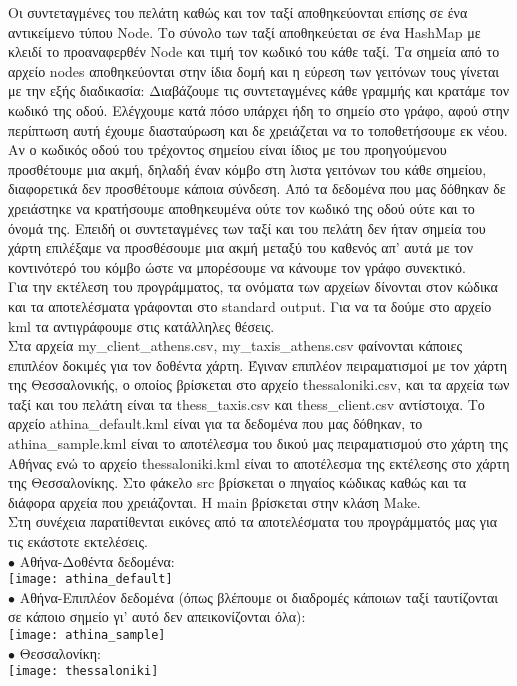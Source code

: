 \documentclass[12pt, a4 paper]{article}
\begin{document}
Οι συντεταγμένες του πελάτη καθώς και τον ταξί αποθηκεύονται επίσης σε ένα αντικείμενο τύπου \textlatin{Node}. Το σύνολο των ταξί αποθηκεύεται σε ένα \textlatin{HashMap} με κλειδί το προαναφερθέν \textlatin{Node} και τιμή τον κωδικό του κάθε ταξί. Τα σημεία από το αρχείο \textlatin{nodes} αποθηκεύονται στην ίδια δομή και η εύρεση των γειτόνων τους γίνεται με την εξής διαδικασία: Διαβάζουμε τις συντεταγμένες κάθε γραμμής και κρατάμε τον κωδικό της οδού. Ελέγχουμε κατά πόσο υπάρχει ήδη το σημείο στο γράφο, αφού στην περίπτωση αυτή έχουμε διασταύρωση και δε χρειάζεται να το τοποθετήσουμε εκ νέου. Αν ο κωδικός οδού του τρέχοντος σημείου είναι ίδιος με του προηγούμενου προσθέτουμε μια ακμή, δηλαδή έναν κόμβο στη λιστα γειτόνων του κάθε σημείου, διαφορετικά δεν προσθέτουμε κάποια σύνδεση. Από τα δεδομένα που μας δόθηκαν δε χρειάστηκε να κρατήσουμε αποθηκευμένα ούτε τον κωδικό της οδού ούτε και το όνομά της. Επειδή οι συντεταγμένες των ταξί και του πελάτη δεν ήταν σημεία του χάρτη επιλέξαμε να προσθέσουμε μια ακμή μεταξύ του καθενός απ' αυτά με τον κοντινότερό του κόμβο ώστε να μπορέσουμε να κάνουμε τον γράφο συνεκτικό.\\
Για την εκτέλεση του προγράμματος, τα ονόματα των αρχείων δίνονται στον κώδικα και τα αποτελέσματα γράφονται στο \textlatin{standard output}. Για να τα δούμε στο αρχείο \textlatin{kml} τα αντιγράφουμε στις κατάλληλες θέσεις.\\
Στα αρχεία \textlatin{my\_client\_athens.csv, my\_taxis\_athens.csv} φαίνονται κάποιες επιπλέον δοκιμές για τον δοθέντα χάρτη. Έγιναν επιπλέον πειραματισμοί με τον χάρτη της Θεσσαλονικής, ο οποίος βρίσκεται στο αρχείο \textlatin{thessaloniki.csv}, και τα αρχεία των ταξί και του πελάτη είναι τα \textlatin{thess\_taxis.csv} και \textlatin{thess\_client.csv} αντίστοιχα. Το αρχείο \textlatin{athina\_default.kml} είναι για τα δεδομένα που μας δόθηκαν, το \textlatin{athina\_sample.kml} είναι το αποτέλεσμα του δικού μας πειραματισμού στο χάρτη της Αθήνας ενώ το αρχείο \textlatin{thessaloniki.kml} είναι το αποτέλεσμα της εκτέλεσης στο χάρτη της Θεσσαλονίκης. Στο φάκελο \textlatin{src} βρίσκεται ο πηγαίος κώδικας καθώς και τα διάφορα αρχεία που χρειάζονται. Η \textlatin{main} βρίσκεται στην κλάση \textlatin{Make}.\\
[10mm]
Στη συνέχεια παρατίθενται εικόνες από τα αποτελέσματα του προγράμματός μας για τις εκάστοτε εκτελέσεις.\\
$\bullet$ Αθήνα-Δοθέντα δεδομένα:\\
[4mm]
\texttt{[image: athina\_default]}\\
[4mm]
\newpage
$\bullet$ Αθήνα-Επιπλέον δεδομένα (όπως βλέπουμε οι διαδρομές κάποιων ταξί ταυτίζονται σε κάποιο σημείο γι' αυτό δεν απεικονίζονται όλα):\\
[4mm]
\texttt{[image: athina\_sample]}\\
[4mm]
$\bullet$ Θεσσαλονίκη:\\
[4mm]
\texttt{[image: thessaloniki]}\\

 
\end{document}
